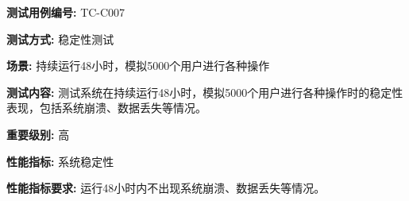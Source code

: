 \begin{framed} \textbf{测试用例编号:} TC-C007

\textbf{测试方式:} 稳定性测试

\textbf{场景:} 持续运行48小时，模拟5000个用户进行各种操作

\textbf{测试内容:} 测试系统在持续运行48小时，模拟5000个用户进行各种操作时的稳定性表现，包括系统崩溃、数据丢失等情况。

\textbf{重要级别:} 高

\textbf{性能指标:} 系统稳定性

\textbf{性能指标要求:} 运行48小时内不出现系统崩溃、数据丢失等情况。

\begin{center}  \end{center} \end{framed}

